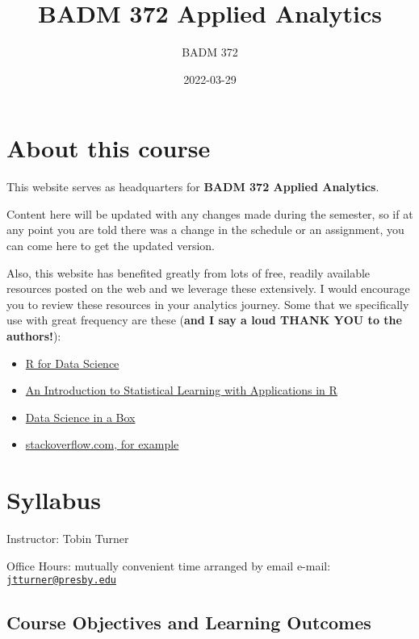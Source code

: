 \documentclass[
]{book}
\title{BADM 372 Applied Analytics}
\author{BADM 372}
\date{2022-03-29}
\providecommand{\tightlist}{%
  \setlength{\itemsep}{0pt}\setlength{\parskip}{0pt}}
\begin{document}
\maketitle

{
\setcounter{tocdepth}{1}
\tableofcontents
}
\hypertarget{about-this-course}{%
\chapter{About this course}\label{about-this-course}}

This website serves as headquarters for \textbf{BADM 372 Applied Analytics}.

Content here will be updated with any changes made during the semester, so if at any point you are told there was a change in the schedule or an assignment, you can come here to get the updated version.

Also, this website has benefited greatly from lots of free, readily available resources posted on the web and we leverage these extensively. I would encourage you to review these resources in your analytics journey. Some that we specifically use with great frequency are these (\textbf{and I say a loud THANK YOU to the authors!}):

\begin{itemize}
\tightlist
\item
  \href{https://r4ds.had.co.nz/}{R for Data Science}
\item
  \href{https://trevorhastie.github.io/ISLR/}{An Introduction to Statistical Learning with Applications in R}
\item
  \href{https://datasciencebox.org/}{Data Science in a Box}
\item
  \href{https://stackoverflow.com/questions/4862178/remove-rows-with-all-or-some-nas-missing-values-in-data-frame?rq=1}{stackoverflow.com, for example}
\end{itemize}

\hypertarget{syllabus}{%
\chapter{Syllabus}\label{syllabus}}

Instructor: Tobin Turner

Office Hours: mutually convenient time arranged by email e-mail: \href{mailto:jtturner@presby.edu}{\nolinkurl{jtturner@presby.edu}}

\hypertarget{course-objectives-and-learning-outcomes}{%
\section{Course Objectives and Learning Outcomes}\label{course-objectives-and-learning-outcomes}}
\end{document}
